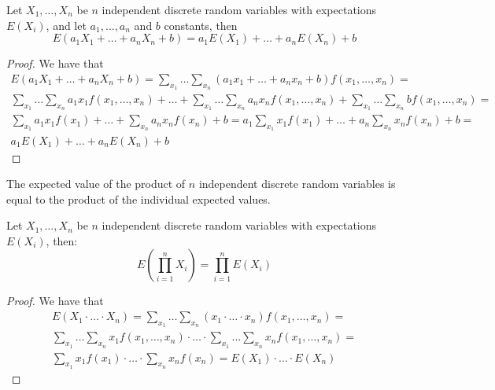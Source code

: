 \begin{proposition}
Let $X_{1}, \ldots, X_{n}$ be $n$ independent discrete random variables with expectations $E\left(X_{i}\right)$, and let $a_1, \ldots, a_n$ and $b$ constants, then
\[
E\left(a_{1}X_{1}+\ldots+a_{n}X_{n}+b\right)=a_{1}E\left(X_{1}\right)+\ldots+a_{n}E\left(X_{n}\right)+b
\]
\end{proposition}
\begin{proof}
We have that
\begin{multline}
E \left(a_1 X_1 + \ldots + a_n X_n +b \right) = 
\sum_{x_1} \ldots \sum_{x_n} \left(a_ 1 x_1 + \ldots + a_n x_n + b  \right) f\left(x_1, \ldots, x_n \right) = \\
\sum_{x_1} \ldots \sum_{x_n} a_1 x_1 f\left(x_1, \ldots, x_n \right) + \ldots + \sum_{x_1} \ldots \sum_{x_n} a_n x_n f\left(x_1, \ldots, x_n \right) + \sum_{x_1} \ldots \sum_{x_n} b f\left(x_1, \ldots, x_n \right) = \\
\sum_{x_1} a_1 x_1 f\left(x_1\right) + \ldots + \sum_{x_n} a_n x_n f\left( x_n \right) + b = 
a_1 \sum_{x_1} x_1 f\left(x_1\right) + \ldots + a_n \sum_{x_n} x_n f\left( x_n \right) + b = \\
a_1 E\left(X_1\right) + \ldots + a_n E\left(X_n\right) + b
\end{multline}
\end{proof}

The expected value of the product of $n$ independent discrete random variables is equal to the product of the individual expected values.

\begin{proposition}
Let $X_{1}, \ldots, X_{n}$ be $n$ independent discrete random variables with expectations $E\left(X_{i}\right)$, then:
\[
E\left(\prod_{i=1}^{n}X_{i}\right)=\prod_{i=1}^{n}E\left(X_{i}\right)
\]
\end{proposition}
\begin{proof}
We have that
\begin{multline}
E \left(X_1  \cdot \ldots \cdot X_n  \right) = 
\sum_{x_1} \ldots \sum_{x_n} \left(x_1 \cdot \ldots \cdot x_n  \right) f\left(x_1, \ldots, x_n \right) = \\
\sum_{x_1} \ldots \sum_{x_n} x_1 f\left(x_1, \ldots, x_n \right) \cdot \ldots \cdot \sum_{x_1} \ldots \sum_{x_n} x_n f\left(x_1, \ldots, x_n \right) = \\
\sum_{x_1} x_1 f\left(x_1\right) \cdot \ldots \cdot \sum_{x_n} x_n f\left( x_n \right) = 
E \left( X_1 \right) \cdot \ldots \cdot E \left( X_n \right)
\end{multline}
\end{proof}

